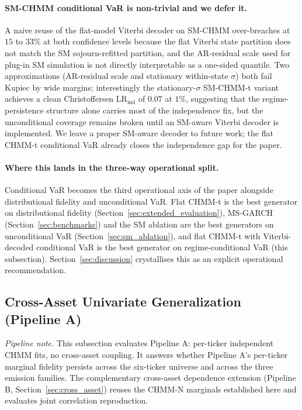 \paragraph{SM-CHMM conditional VaR is non-trivial and we defer it.}
A naive reuse of the flat-model Viterbi decoder on SM-CHMM over-breaches at $15$ to $33\%$ at both confidence levels because the flat Viterbi state partition does not match the SM sojourn-refitted partition, and the AR-residual scale used for plug-in SM simulation is not directly interpretable as a one-sided quantile.
Two approximations (AR-residual scale and stationary within-state $\sigma$) both fail Kupiec by wide margins; interestingly the stationary-$\sigma$ SM-CHMM-t variant achieves a clean Christoffersen $\text{LR}_{\text{ind}}$ of $0.07$ at $1\%$, suggesting that the regime-persistence structure alone carries most of the independence fix, but the unconditional coverage remains broken until an SM-aware Viterbi decoder is implemented.
We leave a proper SM-aware decoder to future work; the flat CHMM-t conditional VaR already closes the independence gap for the paper.

\paragraph{Where this lands in the three-way operational split.}
Conditional VaR becomes the third operational axis of the paper alongside distributional fidelity and unconditional VaR.
Flat CHMM-t is the best generator on distributional fidelity (Section~\ref{sec:extended_evaluation}), MS-GARCH (Section~\ref{sec:benchmarks}) and the SM ablation are the best generators on unconditional VaR (Section~\ref{sec:sm_ablation}), and flat CHMM-t with Viterbi-decoded conditional VaR is the best generator on regime-conditional VaR (this subsection).
Section~\ref{sec:discussion} crystallises this as an explicit operational recommendation.

\subsection{Cross-Asset Univariate Generalization (Pipeline A)}
\label{sec:cross_asset_univariate}

\emph{Pipeline note.} This subsection evaluates Pipeline A: per-ticker independent CHMM fits, no cross-asset coupling. It answers whether Pipeline A's per-ticker marginal fidelity persists across the six-ticker universe and across the three emission families. The complementary cross-asset dependence extension (Pipeline B, Section~\ref{sec:cross_asset}) reuses the CHMM-N marginals established here and evaluates joint correlation reproduction.

